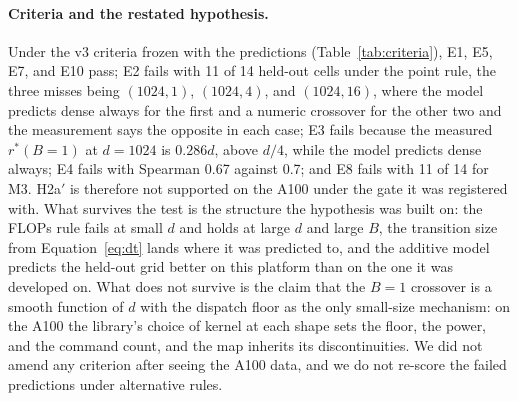 \documentclass{article}
\newcommand{\rstar}{r^{*}}
\begin{document}
\paragraph{Criteria and the restated hypothesis.} Under the v3 criteria frozen with the predictions (Table~\ref{tab:criteria}), E1, E5, E7, and E10 pass; E2 fails with 11 of 14 held-out cells under the point rule, the three misses being $(1024, 1)$, $(1024, 4)$, and $(1024, 16)$, where the model predicts dense always for the first and a numeric crossover for the other two and the measurement says the opposite in each case; E3 fails because the measured $\rstar(B{=}1)$ at $d = 1024$ is $0.286d$, above $d/4$, while the model predicts dense always; E4 fails with Spearman 0.67 against 0.7; and E8 fails with 11 of 14 for M3. H2a$'$ is therefore not supported on the A100 under the gate it was registered with. What survives the test is the structure the hypothesis was built on: the FLOPs rule fails at small $d$ and holds at large $d$ and large $B$, the transition size from Equation~\ref{eq:dt} lands where it was predicted to, and the additive model predicts the held-out grid better on this platform than on the one it was developed on. What does not survive is the claim that the $B = 1$ crossover is a smooth function of $d$ with the dispatch floor as the only small-size mechanism: on the A100 the library's choice of kernel at each shape sets the floor, the power, and the command count, and the map inherits its discontinuities. We did not amend any criterion after seeing the A100 data, and we do not re-score the failed predictions under alternative rules.
\end{document}
